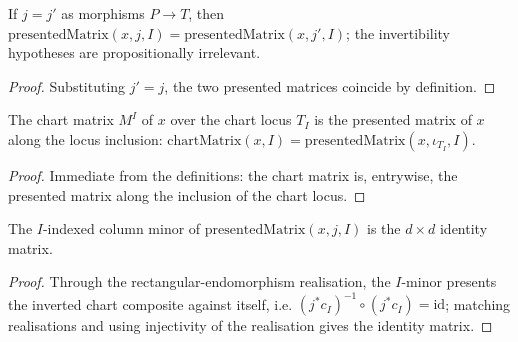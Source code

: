 \begin{lemma}
  \label{lem:gr_presentedMatrix_congr}
  If \(j = j'\) as morphisms \(P \to T\), then \(\mathrm{presentedMatrix}(x, j, I) =
  \mathrm{presentedMatrix}(x, j', I)\); the invertibility hypotheses are propositionally
  irrelevant.
\end{lemma}
\begin{proof}
  \leanok
  Substituting \(j' = j\), the two presented matrices coincide by definition.
\end{proof}

\begin{lemma}
  \label{lem:gr_chartMatrix_eq_presentedMatrix}
  The chart matrix \(M^I\) of \(x\) over the chart locus \(T_I\) is the presented matrix of
  \(x\) along the locus inclusion: \(\mathrm{chartMatrix}(x, I) =
  \mathrm{presentedMatrix}(x, \iota_{T_I}, I)\).
\end{lemma}
\begin{proof}
  \leanok
  Immediate from the definitions: the chart matrix is, entrywise, the presented matrix along
  the inclusion of the chart locus.
\end{proof}

\begin{lemma}
  \label{lem:gr_presentedMatrix_submatrix_self}
  The \(I\)-indexed column minor of \(\mathrm{presentedMatrix}(x, j, I)\) is the \(d\times d\)
  identity matrix.
\end{lemma}
\begin{proof}
  \leanok
  Through the rectangular-endomorphism realisation, the \(I\)-minor presents the inverted
  chart composite against itself, i.e. \((j^{*}c_I)^{-1}\circ (j^{*}c_I) = \mathrm{id}\);
  matching realisations and using injectivity of the realisation gives the identity matrix.
\end{proof}

